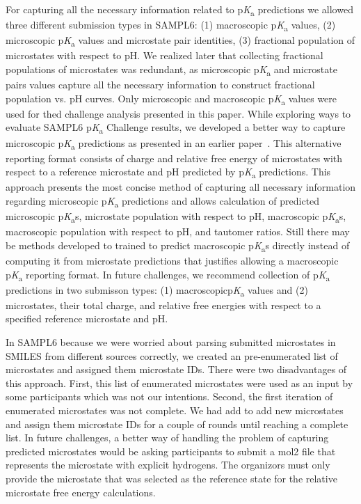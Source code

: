 \documentclass[9pt,lineno,final]{elife}
\newcommand{\pKa}{p\textit{K}\textsubscript{a}}
\begin{document}
For capturing all the necessary information related to \pKa{} predictions we allowed three different submission types in SAMPL6: (1) macroscopic \pKa{} values, (2) microscopic \pKa{} values and microstate pair identities, (3) fractional population of microstates with respect to pH. We realized later that collecting fractional populations of microstates was redundant, as microscopic \pKa{} and microstate pairs values capture all the necessary information to construct fractional population vs. pH curves.  Only microscopic and macroscopic \pKa{} values were used for thed challenge analysis presented in this paper.
While exploring ways to evaluate SAMPL6 \pKa{} Challenge results, we developed a better way to capture microscopic \pKa{} predictions as presented in an earlier paper~\citep{Gunner:2020:J.Comput.AidedMol.Des.}. This alternative reporting format consists of charge and relative free energy of microstates with respect to a reference microstate and pH predicted by \pKa{} predictions. This approach presents the most concise method of capturing all necessary information regarding microscopic \pKa{} predictions and allows calculation of predicted microscopic \pKa{}s, microstate population with respect to pH, macroscopic \pKa{}s, macroscopic population with respect to pH, and tautomer ratios. 
Still there may be methods developed to trained to predict macroscopic \pKa{}s directly instead of computing it from microstate predictions that justifies allowing a macroscopic \pKa{} reporting format. 
In future challenges, we recommend collection of \pKa{} predictions in two submisson types: (1) macroscopic\pKa{} values and (2) microstates, their total charge, and relative free energies with respect to a specified reference microstate and pH. 

In SAMPL6 because we were worried about parsing submitted microstates in SMILES from different sources correctly, we created an pre-enumerated list of microstates and assigned them microstate IDs. There were two disadvantages of this approach. First, this list of enumerated microstates were used as an input by some participants which was not our intentions. Second, the first iteration of enumerated microstates was not complete. We had add to add new microstates and assign them microstate IDs for a couple of rounds until reaching a complete list. In future challenges, a better way of handling the problem of capturing predicted microstates would be asking participants to submit a mol2 file that represents the microstate with explicit hydrogens. The organizors must only provide the microstate that was selected as the reference state for the relative microstate free energy calculations.
\end{document}
